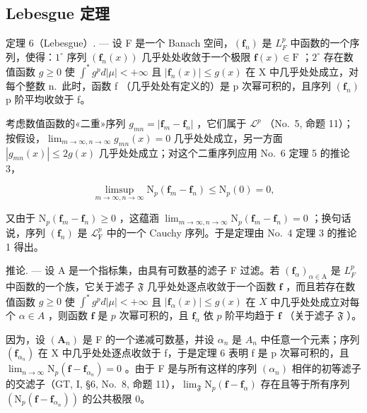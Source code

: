 \subsection{Lebesgue 定理}

定理 6（Lebesgue）. --- 设 F 是一个 Banach 空间，\((\mathbf{f}_{n})\) 是 \(L_{F}^{p}\) 中函数的一个序列，使得：\(1^{\circ}\) 序列 \((\mathbf{f}_{n}(x))\) 几乎处处收敛于一个极限 \(\mathbf{f}(x) \in \mathrm{F}\) ；\(2^{\circ}\) 存在数值函数 \(g \geqslant 0\) 使 \(\int^{*} g^{p} d|\mu| < +\infty\) 且 \(|\mathbf{f}_{n}(x)| \leqslant g(x)\) 在 X 中几乎处处成立，对每个整数 n.~此时，函数 f （几乎处处有定义的）是 p 次幂可积的，且序列 \((\mathbf{f}_{n})\) p 阶平均收敛于 f。

考虑数值函数的«二重»序列 \(g_{mn} = |\mathbf{f}_m - \mathbf{f}_n|\) ，它们属于 \(\mathcal{L}^p\) （No.~5, 命题 11）；按假设，\(\lim_{m\to \infty, n\to \infty}g_{mn}(x) = 0\) 几乎处处成立，另一方面 \(|g_{mn}(x)|\leqslant 2g(x)\) 几乎处处成立；对这个二重序列应用 No.~6 定理 5 的推论 3，

\[
\limsup _ {m \to \infty ,   n \to \infty} \mathrm{N} _ {p} (\mathbf {f} _ {m} - \mathbf {f} _ {n}) \leqslant \mathrm{N} _ {p} (0) = 0  ,
\]

又由于 \(\mathrm{N}_p(\mathbf{f}_m - \mathbf{f}_n) \geqslant 0\) ，这蕴涵 \(\lim_{m \to \infty, n \to \infty} \mathrm{N}_p(\mathbf{f}_m - \mathbf{f}_n) = 0\) ；换句话说，序列 \((\mathbf{f}_n)\) 是 \(\mathcal{L}_{\mathrm{F}}^p\) 中的一个 Cauchy 序列。于是定理由 No.~4 定理 3 的推论 1 得出。

推论. --- 设 A 是一个指标集，由具有可数基的滤子 F 过滤。若 \((\mathbf{f}_{\alpha})_{\alpha \in \mathrm{A}}\) 是 \(L_{F}^{p}\) 中函数的一个族，它关于滤子 \(\mathfrak{F}\) 几乎处处逐点收敛于一个函数 \(\mathbf{f}\) ，而且若存在数值函数 \(g \geqslant 0\) 使 \(\int^{*} g^{p} d|\mu| < +\infty\) 且 \(|\mathbf{f}_{\alpha}(x)| \leqslant g(x)\) 在 \(X\) 中几乎处处成立对每个 \(\alpha \in A\) ，则函数 \(\mathbf{f}\) 是 \(p\) 次幂可积的，且 \(\mathbf{f}_{\alpha}\) 依 \(p\) 阶平均趋于 \(\mathbf{f}\) （关于滤子 \(\mathfrak{F}\) ）。

因为，设 \((\mathbf{A}_{n})\) 是 F 的一个递减可数基，并设 \(\alpha_{n}\) 是 \(A_{n}\) 中任意一个元素；序列 \((\mathbf{f}_{\alpha_{n}})\) 在 X 中几乎处处逐点收敛于 f，于是定理 6 表明 f 是 p 次幂可积的，且 \(\lim_{n\to\infty}\mathrm{N}_{p}(\mathbf{f}-\mathbf{f}_{\alpha_{n}})=0\) 。由于 F 是与所有这样的序列 \((\alpha_{n})\) 相伴的初等滤子的交滤子（GT, I, §6, No.~8, 命题 11），\(\lim_{\mathfrak{F}}\mathrm{N}_{p}(\mathbf{f}-\mathbf{f}_{\alpha})\) 存在且等于所有序列 \((\mathrm{N}_{p}(\mathbf{f}-\mathbf{f}_{\alpha_{n}}))\) 的公共极限 0。

